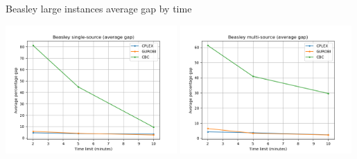 \documentclass{article}
\begin{document}
\begin{center}
	\end{center} 

	\newpage

	\begin{center}
		Beasley large instances average gap by time
		
		\includegraphics[width=0.49\textwidth]{Beasley SS large - Average gap x Time}
		\includegraphics[width=0.49\textwidth]{Beasley MS large - Average gap x Time}
	\end{center}
\end{document}
